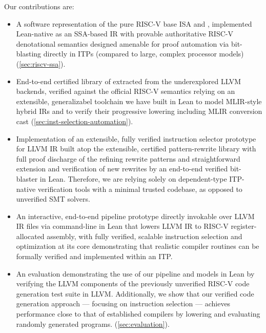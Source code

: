 \documentclass[review, anonymous, acmsmall, screen]{acmart}
\begin{document}
\vspace{.5em}
\noindent
Our contributions are:
\begin{itemize}
\item A software representation of the pure RISC-V base ISA and , implemented Lean-native
 as an SSA-based IR with provable authoritative RISC-V denotational semantics designed amenable for
  proof automation via bit-blasting directly in ITPs (compared to large, complex processor models)
  (\autoref{sec:riscv-ssa}).

\item End-to-end certified library of  extracted from
 the underexplored LLVM backends, verified against the official RISC-V semantics relying on an extensible,
  generalizabel toolchain we have built in Lean to model MLIR-style hybrid IRs and to verify their progressive
   lowering including MLIR conversion cast (\autoref{sec:inst-selection-automation}).

\item Implementation of an extensible, fully verified instruction selector prototype for LLVM IR built
 atop the extensible, certified pattern-rewrite library with full proof discharge of the refining 
 rewrite patterns and straightforward extension and verification of new rewrites by an end-to-end verified 
 bit-blaster in Lean. Therefore, we are relying solely on dependent-type ITP-native verification tools
  with a minimal trusted codebase, as opposed to unverified SMT solvers.

\item An interactive, end-to-end pipeline prototype directly invokable over LLVM IR files via 
command-line in Lean that lowers  LLVM IR to RISC-V register-allocated assembly, with fully verified,
 scalable instruction selection and optimization at its core  demonstrating that realistic compiler 
 routines can be formally verified and implemented within an ITP.

\item An evaluation demonstrating the use of our pipeline and models in Lean by verifying the LLVM 
components of the previously unverified RISC-V code generation test suite in LLVM. Additionally, we 
show that our verified code generation approach — focusing on instruction selection — achieves performance 
close to that of established compilers by lowering and evaluating \sarah[XY]{} randomly generated programs.
 (\autoref{sec:evaluation}).
\end{itemize}
\end{document}
